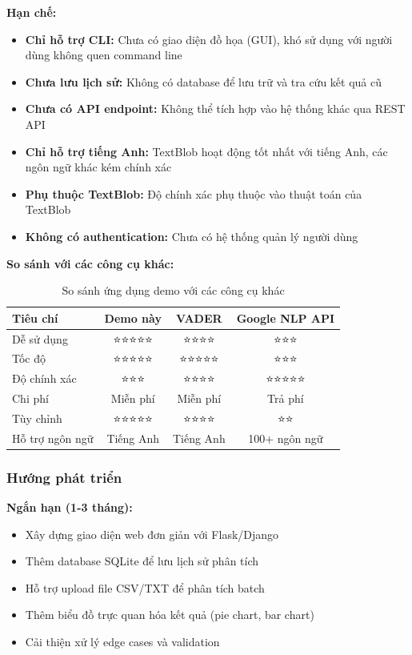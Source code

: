 \textbf{Hạn chế:}
\begin{itemize}
    \item \textbf{Chỉ hỗ trợ CLI:} Chưa có giao diện đồ họa (GUI), khó sử dụng với người dùng không quen command line
    \item \textbf{Chưa lưu lịch sử:} Không có database để lưu trữ và tra cứu kết quả cũ
    \item \textbf{Chưa có API endpoint:} Không thể tích hợp vào hệ thống khác qua REST API
    \item \textbf{Chỉ hỗ trợ tiếng Anh:} TextBlob hoạt động tốt nhất với tiếng Anh, các ngôn ngữ khác kém chính xác
    \item \textbf{Phụ thuộc TextBlob:} Độ chính xác phụ thuộc vào thuật toán của TextBlob
    \item \textbf{Không có authentication:} Chưa có hệ thống quản lý người dùng
\end{itemize}

\textbf{So sánh với các công cụ khác:}

\begin{table}[H]
\centering
\caption{So sánh ứng dụng demo với các công cụ khác}
\begin{tabular}{|l|c|c|c|}
\hline
\textbf{Tiêu chí} & \textbf{Demo này} & \textbf{VADER} & \textbf{Google NLP API} \\
\hline
Dễ sử dụng & ⭐⭐⭐⭐⭐ & ⭐⭐⭐⭐ & ⭐⭐⭐ \\
\hline
Tốc độ & ⭐⭐⭐⭐⭐ & ⭐⭐⭐⭐⭐ & ⭐⭐⭐ \\
\hline
Độ chính xác & ⭐⭐⭐ & ⭐⭐⭐⭐ & ⭐⭐⭐⭐⭐ \\
\hline
Chi phí & Miễn phí & Miễn phí & Trả phí \\
\hline
Tùy chỉnh & ⭐⭐⭐⭐⭐ & ⭐⭐⭐⭐ & ⭐⭐ \\
\hline
Hỗ trợ ngôn ngữ & Tiếng Anh & Tiếng Anh & 100+ ngôn ngữ \\
\hline
\end{tabular}
\end{table}

\subsubsection{Hướng phát triển}

\textbf{Ngắn hạn (1-3 tháng):}
\begin{itemize}
    \item Xây dựng giao diện web đơn giản với Flask/Django
    \item Thêm database SQLite để lưu lịch sử phân tích
    \item Hỗ trợ upload file CSV/TXT để phân tích batch
    \item Thêm biểu đồ trực quan hóa kết quả (pie chart, bar chart)
    \item Cải thiện xử lý edge cases và validation
\end{itemize}

